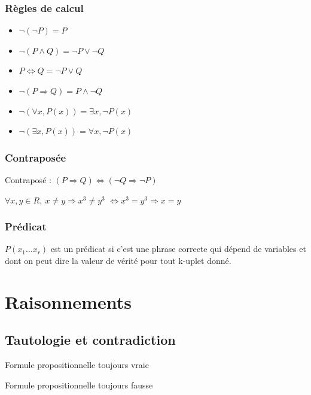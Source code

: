 \documentclass[french]{yLectureNote}
\begin{document}
\subsubsection{Règles de calcul}
\begin{multicols}{2}
    \begin{itemize}
        \item $\neg (\neg P) = P$
        \item $\neg(P \wedge Q) = \neg P \vee \neg Q$
        \item $P\iff Q = \neg P \vee Q$
        \item $\neg (P \Rightarrow Q) = P \wedge \neg Q$
        \item $\neg (\forall x, P(x)) = \exists x, \neg P(x)$
        \item $\neg(\exists x, P(x)) = \forall x, \neg P(x)$
    \end{itemize}
    \end{multicols}


\subsubsection{Contraposée}
Contraposé : $(P \Rightarrow Q) \iff (\neg Q \Rightarrow \neg P)$


$\forall x,y \in R,\: x\neq y \Rightarrow x^3\neq y^3$ $\iff x^3=y^3 \Rightarrow x=y$

\subsubsection{Prédicat}
$P(x_1\dots x_r)$ est un prédicat si c'est une phrase correcte qui dépend de variables et dont on peut dire la valeur de vérité pour tout k-uplet donné.
\section{Raisonnements}
\subsection{Tautologie et contradiction}

\begin{theorem}[Tautologie]
Formule propositionnelle toujours vraie
\end{theorem}
\begin{theorem}[Contradiction]
Formule propositionnelle toujours fausse
\end{theorem}
\end{document}
